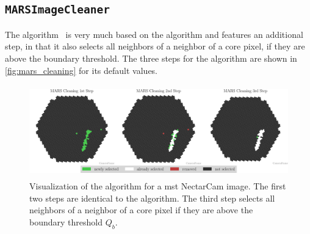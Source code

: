 \subsection*{\texttt{MARSImageCleaner}}%
\vspace{-0.2cm}
The \mars{} algorithm~\cite{mars} is very much based on the \tailcuts{}
algorithm and features an additional step, in that it also selects all neighbors of a neighbor of a
core pixel, if they are above the boundary threshold. The three steps for the \mars{} algorithm
are shown in \autoref{fig:mars_cleaning} for its default values.
\begin{figure}[!htbp]
    \centering
    \includegraphics[height=4cm]{plots/cleaner_steps/mars.pdf}
    \caption{Visualization of the \mars{} algorithm for a \gls{mst} NectarCam image. The first two
    steps are identical to the \tailcuts{} algorithm. The third step selects all neighbors of a neighbor of a
    core pixel if they are above the boundary threshold \(Q_b\).}%
    \label{fig:mars_cleaning}
\end{figure}
